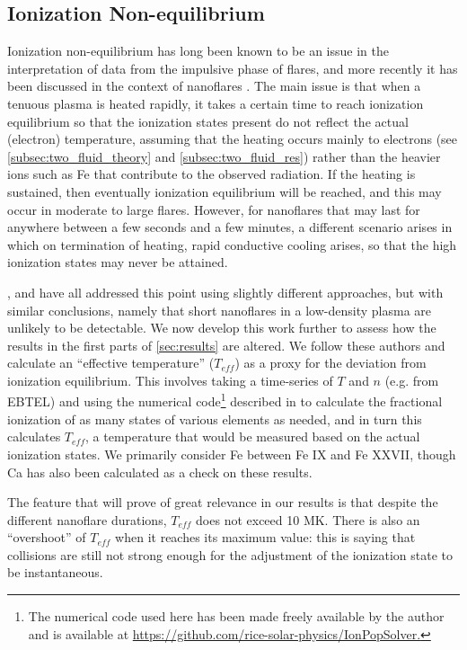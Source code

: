 \documentclass[]{aastex}
\begin{document}
	\subsection{Ionization Non-equilibrium}
	\label{subsec:nei_theory}
	\par Ionization non-equilibrium has long been known to be an issue in the interpretation of data from the impulsive phase of flares, and more recently it has been discussed in the context of nanoflares \citep{bradshaw_explosive_2006,reale_nonequilibrium_2008}. The main issue is that when a tenuous plasma is heated rapidly, it takes a certain time to reach ionization equilibrium so that the ionization states present do not reflect the actual (electron) temperature, assuming that the heating occurs mainly to electrons (see \autoref{subsec:two_fluid_theory} and \autoref{subsec:two_fluid_res}) rather than the heavier ions such as Fe that contribute to the observed radiation. If the heating is sustained, then eventually ionization equilibrium will be reached, and this may occur in moderate to large flares. However, for nanoflares that may last for anywhere between a few seconds and a few minutes, a different scenario arises in which on termination of heating, rapid conductive cooling arises, so that the high ionization states may never be attained.
	\par \citet{bradshaw_explosive_2006}, \citet{reale_nonequilibrium_2008} and \citet{bradshaw_numerical_2009} have all addressed this point using slightly different approaches, but with similar conclusions, namely that short nanoflares in a low-density plasma are unlikely to be detectable. We now develop this work further to assess how the results in the first parts of \autoref{sec:results} are altered. We follow these authors and calculate an ``effective temperature'' ($T_{eff}$) as a proxy for the deviation from ionization equilibrium. This involves taking a time-series of $T$ and $n$ (e.g. from EBTEL) and using the numerical code\footnote{The numerical code used here has been made freely available by the author and is available at \url{https://github.com/rice-solar-physics/IonPopSolver.}} described in \citet{bradshaw_numerical_2009} to calculate the fractional ionization of as many states of various elements as needed, and in turn this calculates $T_{eff}$, a temperature that would be measured based on the actual ionization states. We primarily consider Fe between Fe IX and Fe XXVII, though Ca has also been calculated as a check on these results.
	\par The feature that will prove of great relevance in our results is that despite the different nanoflare durations, $T_{eff}$ does not exceed 10 MK. There is also an ``overshoot'' of $T_{eff}$ when it reaches its maximum value: this is saying that collisions are still not strong enough for the adjustment of the ionization state to be instantaneous.
\end{document}
